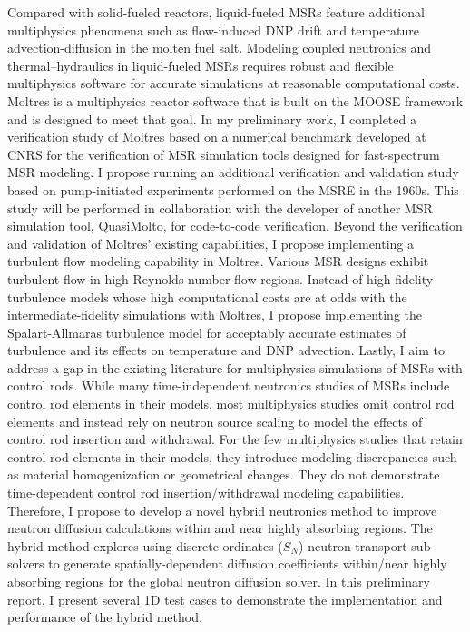 Compared with solid-fueled reactors, liquid-fueled \glspl{MSR} feature additional multiphysics
phenomena such as flow-induced DNP drift and temperature advection-diffusion in the molten fuel
salt. Modeling coupled neutronics and thermal–hydraulics in
liquid-fueled \glspl{MSR} requires robust and flexible multiphysics software for accurate
simulations at reasonable computational costs. Moltres is a multiphysics reactor software that
is built on the \gls{MOOSE} framework and is designed
to meet that goal. In my preliminary work, I completed a verification study of Moltres based on a
numerical benchmark developed at \gls{CNRS} for the verification of \gls{MSR} simulation tools
designed for fast-spectrum \gls{MSR} modeling. I propose running an additional verification and
validation study based on pump-initiated experiments performed on the \gls{MSRE} in the 1960s.
This study will be performed in collaboration with the developer of another \gls{MSR} simulation
tool, QuasiMolto, for code-to-code verification. Beyond the verification and validation of Moltres’
existing capabilities, I propose implementing a turbulent flow modeling
capability in Moltres. Various \gls{MSR} designs exhibit turbulent flow in high Reynolds number
flow regions. Instead of high-fidelity turbulence models whose high computational costs are at odds
with the intermediate-fidelity simulations with Moltres, I propose implementing the
Spalart-Allmaras turbulence model for acceptably accurate estimates of turbulence and its effects
on temperature and \gls{DNP} advection.
Lastly, I aim to address a gap in the existing literature for multiphysics simulations of MSRs with
control rods. While many time-independent neutronics studies of MSRs
include control rod elements in their models, most multiphysics studies omit control rod
elements and instead rely on neutron source scaling to model the effects of control rod insertion
and withdrawal. For the few multiphysics studies that retain control
rod elements in their models, they introduce modeling discrepancies such as material homogenization
or geometrical changes. They do not demonstrate time-dependent control rod insertion/withdrawal
modeling capabilities. Therefore, I propose to develop a novel hybrid neutronics method to improve
neutron diffusion calculations within and near highly absorbing regions. The hybrid method explores
using discrete ordinates ($S_N$) neutron transport sub-solvers to generate spatially-dependent
diffusion coefficients within/near highly absorbing regions for the global neutron diffusion
solver. In this preliminary report, I present several 1D test cases to demonstrate the
implementation and performance of the hybrid method.
